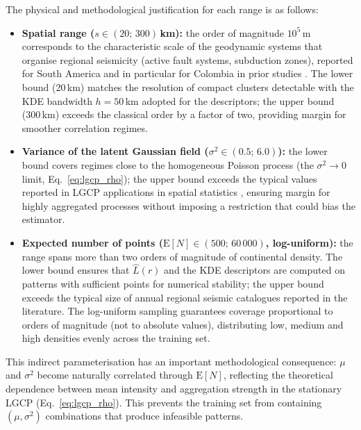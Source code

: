 \documentclass[a4paper,fleqn]{cas-sc}
\numberwithin{equation}{section}
\begin{document}
The physical and methodological justification for each range is as
follows:
\begin{itemize}
    \item \textbf{Spatial range ($s \in (20;\, 300)$\,km):} the order
    of magnitude $10^5$\,m corresponds to the characteristic scale of
    the geodynamic systems that organise regional seismicity (active
    fault systems, subduction zones), reported for South America and
    in particular for Colombia in prior studies \citep{TesisColegas}.
    The lower bound (20\,km) matches the resolution of compact
    clusters detectable with the KDE bandwidth $h=50$\,km adopted for
    the descriptors; the upper bound (300\,km) exceeds the classical
    order by a factor of two, providing margin for smoother
    correlation regimes.

    \item \textbf{Variance of the latent Gaussian field
    ($\sigma^2 \in (0.5;\, 6.0)$):} the lower bound covers regimes
    close to the homogeneous Poisson process (the $\sigma^2 \to 0$
    limit, Eq.~\ref{eq:lgcp_rho}); the upper bound exceeds the
    typical values reported in LGCP applications in spatial
    statistics \citep{Moller1998,MollerWaagepetersen2004}, ensuring
    margin for highly aggregated processes without imposing a
    restriction that could bias the estimator.

    \item \textbf{Expected number of points
    ($\mathrm{E}[N] \in (500;\, 60\,000)$, log-uniform):} the range
    spans more than two orders of magnitude of continental density.
    The lower bound ensures that $\hat{L}(r)$ and the KDE descriptors
    are computed on patterns with sufficient points for numerical
    stability; the upper bound exceeds the typical size of annual
    regional seismic catalogues reported in the literature. The
    log-uniform sampling guarantees coverage proportional to orders
    of magnitude (not to absolute values), distributing low, medium
    and high densities evenly across the training set.
\end{itemize}

This indirect parameterisation has an important methodological
consequence: $\mu$ and $\sigma^2$ become naturally correlated through
$\mathrm{E}[N]$, reflecting the theoretical dependence between mean
intensity and aggregation strength in the stationary LGCP
(Eq.~\ref{eq:lgcp_rho}). This prevents the training set from
containing $(\mu,\sigma^2)$ combinations that produce infeasible
patterns.
\end{document}
